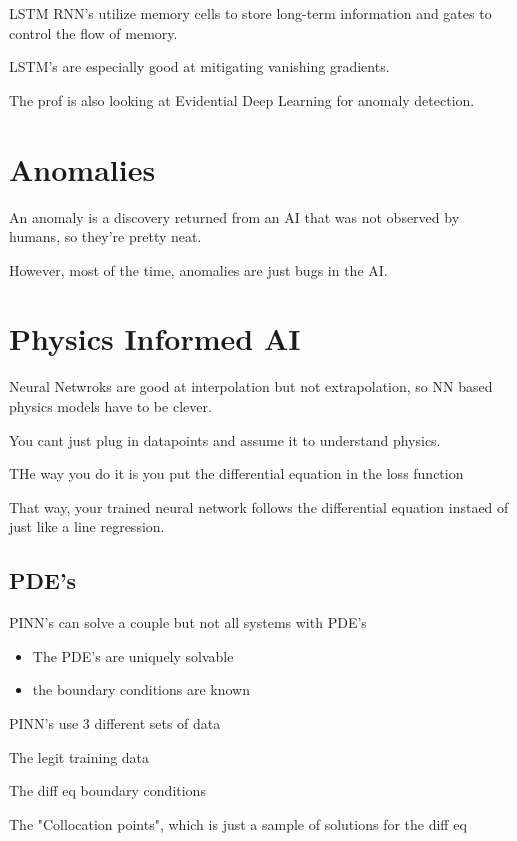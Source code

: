 \documentclass[fleqn]{report}
\begin{document}
LSTM RNN's utilize memory cells to store long-term information 
and gates to control the flow of memory. 

LSTM's are especially good at mitigating vanishing gradients. 

The prof is also looking at Evidential Deep Learning for anomaly detection. 
\section{Anomalies}


An anomaly is a discovery returned from an AI that was not 
observed by humans, so they're pretty neat. 

However, most of the time, anomalies are just bugs in the AI. 

\section{Physics Informed AI}
Neural Netwroks are good at interpolation but not extrapolation, so 
NN based physics models have to be clever.
 
You cant just plug in datapoints and assume it to understand physics. 

THe way you do it is you put the differential equation in the loss function 

That way, your trained neural network follows the differential equation 
instaed of just like a line regression. 

\subsection{PDE's}
PINN's can solve a couple but not all systems with PDE's 

\begin{itemize}
    \item 
    The PDE's are uniquely solvable 
    \item 
    the boundary conditions are known 
\end{itemize}

PINN's use 3 different sets of data 

The legit training data 

The diff eq boundary conditions 

The "Collocation points", which is just a sample of solutions for the diff eq
\end{document}
